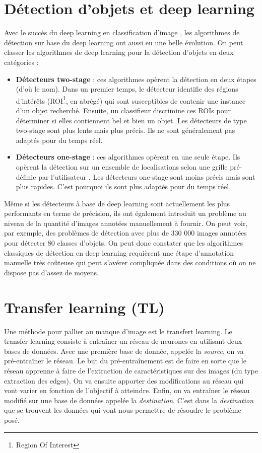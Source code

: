 \section{Détection d'objets et deep learning}
Avec le succès du deep learning en classification d'image \cite{im-class-nn}, les algorithmes de détection sur base du deep learning ont aussi eu une belle évolution. On peut classer les algorithmes de deep learning pour la détection d'objets en deux catégories :
\begin{itemize}
    \item \textbf{Détecteurs two-stage} \cite{R-CNN, Fast-RCNN, Faster-R-CNN} : ces algorithmes opèrent la détection en deux étapes (d'où le nom). Dans un premier temps, le détecteur identifie des régions d'intérêts (ROI\footnote{Region Of Interest}, en abrégé) qui sont susceptibles de contenir une instance d'un objet recherché. Ensuite, un classifieur discrimine ces ROIs pour déterminer si elles contiennent bel et bien un objet. Les détecteurs de type two-stage sont plus lents mais plus précis. Ils ne sont généralement pas adaptés pour du temps réel.
    \item \textbf{Détecteurs one-stage} \cite{YOLO, YOLO9000, YOLOv3, SSD, Retinanet} : ces algorithmes opèrent en une seule étape. Ils opèrent la détection sur un ensemble de localisations selon une grille pré-définie par l'utilisateur . Les détecteurs one-stage sont moins précis mais sont plus rapides. C'est pourquoi ils sont plus adaptés pour du temps réel.
\end{itemize}
Même si les détecteurs à base de deep learning sont actuellement les plus performants en terme de précision, ils ont également introduit un problème au niveau de la quantité d'images annotées manuellement à fournir. On peut voir, par exemple, des problèmes de détection \cite{COCO} avec plus de 330 000 images annotées pour détecter 80 classes d'objets. On peut donc constater que les algorithmes classiques de détection en deep learning requièrent une étape d'annotation manuelle très coûteuse qui peut s'avérer compliquée dans des conditions où on ne dispose pas d'assez de moyens.

\section{Transfer learning (TL)}
Une méthode pour pallier au manque d'image est le transfert learning. Le transfer learning consiste à entraîner un réseau de neurones en utilisant deux bases de données. Avec une première base de donnée, appelée la \textit{source}, on va pré-entraîner le réseau. Le but du pré-entraînement est de faire en sorte que le réseau apprenne à faire de l'extraction de caractéristiques sur des images (du type extraction des edges). On va ensuite apporter des modifications au réseau qui vont varier en fonction de l'objectif à atteindre. Enfin, on va entraîner le réseau modifié sur une base de données appelée la \textit{destination}. C'est dans la \textit{destination} que se trouvent les données qui vont nous permettre de résoudre le problème posé.

